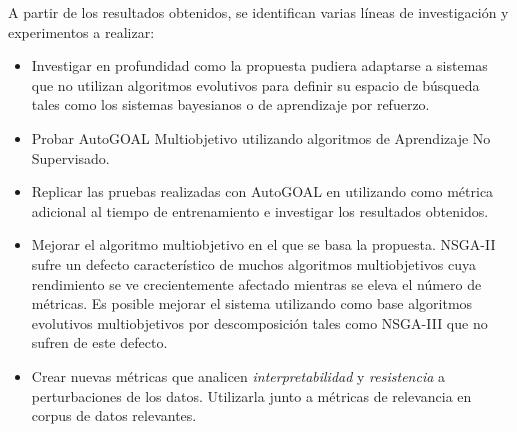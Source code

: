 \begin{recomendations}
A partir de los resultados obtenidos, se identifican varias l\'ineas de investigaci\'on y experimentos a realizar:
\begin{itemize}
    \item Investigar en profundidad  como la propuesta pudiera adaptarse a sistemas que no utilizan algoritmos evolutivos para definir su espacio de b\'usqueda tales como los sistemas bayesianos o de aprendizaje por refuerzo.
    \item Probar AutoGOAL Multiobjetivo utilizando algoritmos de Aprendizaje No Supervisado.
    \item Replicar las pruebas realizadas con AutoGOAL en  utilizando como m\'etrica adicional al tiempo de entrenamiento  e investigar los resultados obtenidos. 
    \item Mejorar el algoritmo multiobjetivo en el que se basa la propuesta. NSGA-II sufre un defecto caracter\'istico de muchos algoritmos multiobjetivos cuya rendimiento se ve crecientemente afectado mientras se eleva el n\'umero de m\'etricas. Es posible mejorar el sistema utilizando como base algoritmos evolutivos multiobjetivos por descomposici\'on tales como NSGA-III  que no sufren de este defecto.
    
    \item Crear nuevas m\'etricas que analicen \textit{interpretabilidad} y \textit{resistencia} a perturbaciones de los datos. Utilizarla junto a m\'etricas de relevancia en corpus de datos relevantes.
\end{itemize}

\end{recomendations}
